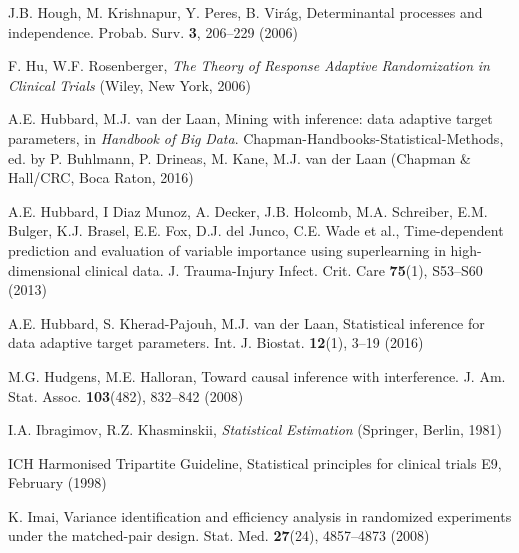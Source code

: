 \begin{list}{}{\setlength{\leftmargin}{2.1em}\setlength{\labelwidth}{0pt}
  \setlength{\labelsep}{0pt}\setlength{\itemindent}{-2.1em}
  \setlength{\parsep}{0pt}\setlength{\itemsep}{2pt}\setlength{\topsep}{0pt}}
\item\label{refentry:REF160}J.B. Hough, M. Krishnapur, Y. Peres, B. Virág, Determinantal processes and independence. Probab. Surv. \textbf{3}, 206--229 (2006)\label{refend:REF160}
\item\label{refentry:REF161}F. Hu, W.F. Rosenberger, \textit{The} \textit{Theory} \textit{of} \textit{Response} \textit{Adaptive} \textit{Randomization} \textit{in} \textit{Clinical} \textit{Trials} (Wiley, New York, 2006)\label{refend:REF161}
\item\label{refentry:REF162}A.E. Hubbard, M.J. van der Laan, Mining with inference: data adaptive target parameters, in \textit{Handbook} \textit{of} \textit{Big} \textit{Data}. Chapman-Handbooks-Statistical-Methods, ed. by P. Buhlmann, P. Drineas, M. Kane, M.J. van der Laan (Chapman \& Hall/CRC, Boca Raton, 2016)\label{refend:REF162}
\item\label{refentry:REF163}A.E. Hubbard, I Diaz Munoz, A. Decker, J.B. Holcomb, M.A. Schreiber, E.M. Bulger, K.J. Brasel, E.E. Fox, D.J. del Junco, C.E. Wade et al., Time-dependent prediction and evaluation of variable importance using superlearning in high-dimensional clinical data. J. Trauma-Injury Infect. Crit. Care \textbf{75}(1), S53--S60 (2013)\label{refend:REF163}
\item\label{refentry:REF164}A.E. Hubbard, S. Kherad-Pajouh, M.J. van der Laan, Statistical inference for data adaptive target parameters. Int. J. Biostat. \textbf{12}(1), 3--19 (2016)\label{refend:REF164}
\item\label{refentry:REF165}M.G. Hudgens, M.E. Halloran, Toward causal inference with interference. J. Am. Stat. Assoc. \textbf{103}(482), 832--842 (2008)\label{refend:REF165}
\item\label{refentry:REF166}I.A. Ibragimov, R.Z. Khasminskii, \textit{Statistical} \textit{Estimation} (Springer, Berlin, 1981)\label{refend:REF166}
\item\label{refentry:REF167}ICH Harmonised Tripartite Guideline, Statistical principles for clinical trials E9, February (1998)\label{refend:REF167}
\item\label{refentry:REF168}K. Imai, Variance identification and efficiency analysis in randomized experiments under the matched-pair design. Stat. Med. \textbf{27}(24), 4857--4873 (2008)\label{refend:REF168}

\end{list}
